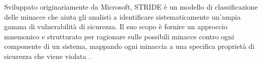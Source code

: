

Sviluppato originariamente da Microsoft, STRIDE è un modello di classificazione delle minacce che aiuta gli analisti a identificare sistematicamente un'ampia gamma di vulnerabilità di sicurezza. Il suo scopo è fornire un approccio mnemonico e strutturato per ragionare sulle possibili minacce contro ogni componente di un sistema, mappando ogni minaccia a una specifica proprietà di sicurezza che viene violata \cite{STRIDE-paper, libro-threat-modelling-designin-for-security}.

